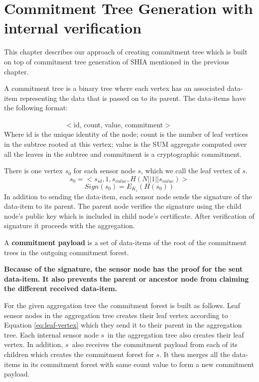 \chapter{Commitment Tree Generation with internal verification} %
\label{cha:A Protocol for Commitment Tree Generation}
	
	This chapter describes our approach of creating commitment tree which is built on top of commitment tree generation of SHIA mentioned in the previous chapter.

	\begin{definition}
		\label{def:data-item}
		A commitment tree is a binary tree where each vertex has an associated data-item representing the data that is passed on to its parent. The data-items have the following format:

		$\hspace{100pt}$ $<$id, count, value, commitment$>$\\
		Where id is the unique identity of the node; count is the number of leaf vertices in the subtree rooted at this vertex; value is the SUM aggregate computed over all the leaves in the subtree and commitment is a cryptographic commitment.
	\end{definition}
	There is one vertex $s_{0}$ for each sensor node $s$, which we call the leaf vertex of $s$. 
	\begin{equation}
		\label{eq:leaf-vertex}
		s_{0} = <s_{id}, 1, s_{value}, H(N||1||s_{value})>
	\end{equation}
	\begin{equation}
		Sign(s_{0}) = E_{K_{s}}(H(s_{0}))
	\end{equation}
	In addition to sending the data-item, each sensor node sends the signature of the data-item to its parent.
	The parent node verifies the signature using the child node's public key which is included in child node's certificate.
	After verification of signature it proceeds with the aggregation.
	\begin{definition}
		A \textbf{commitment payload} is a set of data-items of the root of the commitment trees in the outgoing commitment forest.
	\end{definition}

	\textbf{Because of the signature, the sensor node has the proof for the sent data-item.
			It also prevents the parent or ancestor node from claiming the different received data-item.}

	For the given aggregation tree the commitment forest is built as follows.
	Leaf sensor nodes in the aggregation tree creates their leaf vertex according to Equation \ref{eq:leaf-vertex} which they send it to their parent in the aggregation tree.
	Each internal sensor node $s$\ in the aggregation tree also creates their leaf vertex.
	In addition, $s$\ also receives the commitment payload from each of its children which creates the commitment forest for $s$.
	It then merges all the data-items in its commitment forest with same count value to form a new commitment payload.

